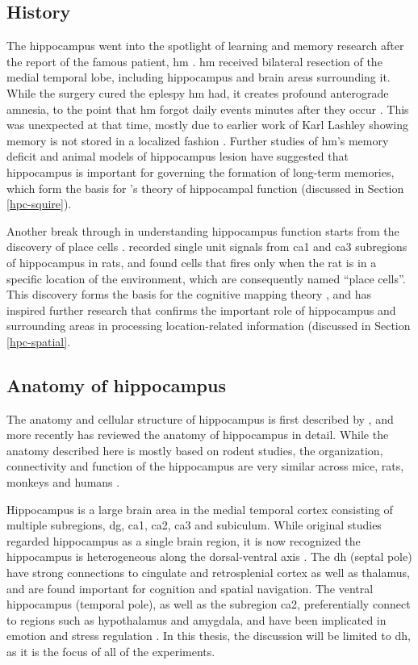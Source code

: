 \subsection{History}
The hippocampus went into the spotlight of learning and memory research after the report of the famous patient, \gls{hm} \citep{scoville57, squire09}. \Gls{hm} received bilateral resection of the medial temporal lobe, including hippocampus and brain areas surrounding it. While the surgery cured the eplespy \gls{hm} had, it creates profound anterograde amnesia, to the point that \gls{hm} forgot daily events minutes after they occur \citep{scoville57, squire09}. This was unexpected at that time, mostly due to earlier work of Karl Lashley showing memory is not stored in a localized fashion \citep{bruce01}. Further studies of \gls{hm}'s memory deficit and animal models of hippocampus lesion have suggested that hippocampus is important for governing the formation of long-term memories, which form the basis for \citet{squire91}'s theory of hippocampal function (discussed in Section \ref{hpc-squire}).

Another break through in understanding hippocampus function starts from the discovery of place cells \citep{o'keefe71}. \citet{o'keefe71} recorded single unit signals from \gls{ca1} and \gls{ca3} subregions of hippocampus in rats, and found cells that fires only when the rat is in a specific location of the environment, which are consequently named ``place cells''. This discovery forms the basis for the cognitive mapping theory \citep{o'keefe76}, and has inspired further research that confirms the important role of hippocampus and surrounding areas in processing location-related information (discussed in Section \ref{hpc-spatial}.

\subsection{Anatomy of hippocampus}
The anatomy and cellular structure of hippocampus is first described by \citet{cajal93}, and more recently \citet{strien09} has reviewed the anatomy of hippocampus in detail. While the anatomy described here is mostly based on rodent studies, the organization, connectivity and function of the hippocampus are very similar across mice, rats, monkeys and humans \citep{clark13}. 

Hippocampus is a large brain area in the medial temporal cortex consisting of multiple subregions, \gls{dg}, \gls{ca1}, \gls{ca2}, \gls{ca3} and subiculum. While original studies regarded hippocampus as a single brain region, it is now recognized the hippocampus is heterogeneous along the dorsal-ventral axis \citep{moser98, fanselow10}. The \gls{dh} (septal pole) have strong connections to cingulate and retrosplenial cortex as well as thalamus, and are found important for cognition and spatial navigation. The ventral hippocampus (temporal pole), as well as the subregion \gls{ca2}, preferentially connect to regions such as hypothalamus and amygdala, and have been implicated in emotion and stress regulation \citep{fanselow10, chevaleyre16}. In this thesis, the discussion will be limited to \gls{dh}, as it is the focus of all of the experiments.

